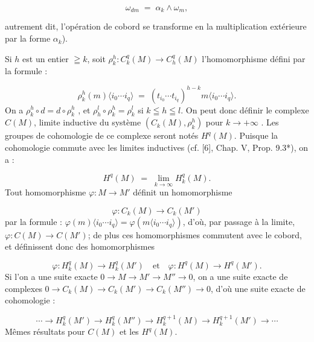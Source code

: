 \begin{equation*}
\omega_{dm} \;=\; \alpha_k \wedge \omega_m , 
\end{equation*}


 autrement dit, l'opération de cobord se transforme en la multiplication extérieure par la forme $\alpha_k$).

Si $h$ est un entier $\geqq k$, soit $\rho^h_k: C^q_k(M) \to C^q_h(M)$ l'homomorphisme défini par la formule :

\begin{equation*}
\rho^h_k(m)\langle i_0 \cdots i_q \rangle \;=\; (t_{i_0} \cdots t_{i_q})^{h-k} m\langle i_0 \cdots i_q \rangle.
\end{equation*}
On a $\rho^h_k \circ d = d \circ \rho^h_k$ , et $\rho^l_h \circ \rho^h_k = \rho^l_k$ si $k \leqq h \leqq l$. On peut donc définir le complexe $C(M)$, limite inductive du système $(C_k(M), \rho^h_k)$ pour $k \to +\infty$ . Les groupes de cohomologie de ce complexe seront notés $H^q(M)$. Puisque la cohomologie commute avec les limites inductives (cf. [6], Chap. V, Prop. 9.3*), on a :

\begin{equation*}
H^q(M) \;=\; \lim_{k \to \infty} H^q_k(M).
\end{equation*}
Tout homomorphisme $\varphi: M \to M'$ définit un homomorphisme

\begin{equation*}
\varphi: C_k(M) \to C_k(M')
\end{equation*}
par la formule : $\varphi(m)\langle i_0 \cdots i_q \rangle = \varphi(m\langle i_0 \cdots i_q \rangle)$, d'où, par passage à la limite, $\varphi: C(M) \to C(M')$; de plus ces homomorphismes commutent avec le cobord, et définissent donc des homomorphismes

\begin{equation*}
\varphi: H^q_k(M) \to H^q_k(M') \quad \mathrm{et} \quad \varphi: H^q(M) \to H^q(M').
\end{equation*}
Si l'on a une suite exacte $0 \to M \to M' \to M'' \to 0$, on a une suite exacte de complexes $0 \to C_k(M) \to C_k(M') \to C_k(M'') \to 0$, d'où une suite exacte de cohomologie :

\begin{equation*}
\cdots \to H^q_k(M') \to H^q_k(M'') \to H^{q+1}_k(M) \to H^{q+1}_k(M') \to \cdots
\end{equation*}
Mêmes résultats pour $C(M)$ et les $H^q(M)$.

